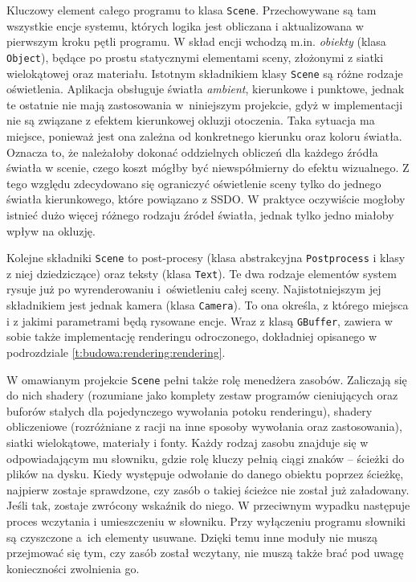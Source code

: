 	Kluczowy element całego programu to klasa \texttt{Scene}. Przechowywane są tam wszystkie encje systemu, których logika jest obliczana i aktualizowana w pierwszym kroku pętli programu. W skład encji wchodzą m.in. \emph{obiekty} (klasa \texttt{Object}), będące po prostu statycznymi elementami sceny, złożonymi z siatki wielokątowej oraz materiału. Istotnym składnikiem klasy \texttt{Scene} są różne rodzaje oświetlenia. Aplikacja obsługuje światła \emph{ambient}, kierunkowe i punktowe, jednak te ostatnie nie mają zastosowania w~niniejszym projekcie, gdyż w implementacji nie są związane z efektem kierunkowej okluzji otoczenia. Taka sytuacja ma miejsce, ponieważ jest ona zależna od konkretnego kierunku oraz koloru światła. Oznacza to, że należałoby dokonać oddzielnych obliczeń dla każdego źródła światła w scenie, czego koszt mógłby być niewspółmierny do efektu wizualnego. Z tego względu zdecydowano się ograniczyć oświetlenie sceny tylko do jednego światła kierunkowego, które powiązano z SSDO. W praktyce oczywiście mogłoby istnieć dużo więcej różnego rodzaju źródeł światła, jednak tylko jedno miałoby wpływ na okluzję.
	
	Kolejne składniki \texttt{Scene} to post-procesy (klasa abstrakcyjna \texttt{Postprocess} i klasy z niej dziedziczące) oraz teksty (klasa \texttt{Text}). Te dwa rodzaje elementów system rysuje już po wyrenderowaniu i~oświetleniu całej sceny. Najistotniejszym jej składnikiem jest jednak kamera (klasa \texttt{Camera}). To ona określa, z którego miejsca i z jakimi parametrami będą rysowane encje. Wraz z klasą \texttt{GBuffer}, zawiera w sobie także implementację renderingu odroczonego, dokładniej opisanego w podrozdziale \ref{t:budowa:rendering:rendering}.
	
	W omawianym projekcie \texttt{Scene} pełni także rolę menedżera zasobów. Zaliczają się do nich shadery (rozumiane jako komplety zestaw programów cieniujących oraz buforów stałych dla pojedynczego wywołania potoku renderingu), shadery obliczeniowe (rozróżniane z racji na inne sposoby wywołania oraz zastosowania), siatki wielokątowe, materiały i fonty. Każdy rodzaj zasobu znajduje się w odpowiadającym mu słowniku, gdzie rolę kluczy pełnią ciągi znaków -- ścieżki do plików na dysku. Kiedy występuje odwołanie do danego obiektu poprzez ścieżkę, najpierw zostaje sprawdzone, czy zasób o takiej ścieżce nie został już załadowany. Jeśli tak, zostaje zwrócony wskaźnik do niego. W przeciwnym wypadku następuje proces wczytania i umieszczeniu w słowniku. Przy wyłączeniu programu słowniki są czyszczone a~ich elementy usuwane. Dzięki temu inne moduły nie muszą przejmować się tym, czy zasób został wczytany, nie muszą także brać pod uwagę konieczności zwolnienia go.
	

